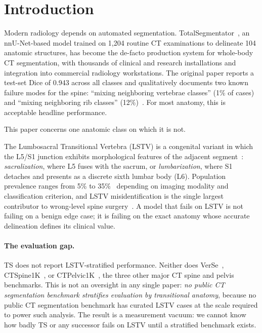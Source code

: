 \documentclass{article}
\newcommand{\TS}{TotalSegmentator}
\begin{document}
\section{Introduction}
\label{sec:intro}

Modern radiology depends on automated segmentation.
\TS{}~\citep{Wasserthal2023TotalSegmentator:Images}, an nnU-Net-based
model trained on 1{,}204 routine CT examinations to delineate
104 anatomic structures, has become the de-facto production
system for whole-body CT segmentation, with thousands of clinical
and research installations and integration into commercial
radiology workstations.
The original paper reports a test-set Dice of 0.943 across all
classes and qualitatively documents two known failure modes for
the spine: ``mixing neighboring vertebrae classes'' (1\% of cases)
and ``mixing neighboring rib classes''
(12\%)~\citep[Figure 4]{Wasserthal2023TotalSegmentator:Images}.
For most anatomy, this is acceptable headline performance.

This paper concerns one anatomic class on which it is not.

The Lumbosacral Transitional Vertebra (LSTV) is a congenital
variant in which the L5/S1 junction exhibits morphological features
of the adjacent segment~\citep{Castellvi1984LumbosacralDefects}: \emph{sacralization},
where L5 fuses with the sacrum, or \emph{lumbarization}, where S1
detaches and presents as a discrete sixth lumbar body (L6).
Population prevalence ranges from 5\% to
35\%~\citep{Sekharappa2014LumbosacralSignificance} depending on imaging modality
and classification criterion, and LSTV misidentification is the
single largest contributor to wrong-level spine
surgery~\citep{Konin2010LumbosacralRelevance,Carrino2011EffectImaging}.
A model that fails on LSTV is not failing on a benign edge case;
it is failing on the exact anatomy whose accurate delineation
defines its clinical value.

\paragraph{The evaluation gap.}
TS does not report LSTV-stratified performance.
Neither does VerSe~\citep{Sekuboyina2020VerSe:Benchmark},
CTSpine1K~\citep{Deng2021CTSpine1K:Tomography}, or
CTPelvic1K~\citep{Liu2021DeepModels}, the three other major CT spine
and pelvis benchmarks.
This is not an oversight in any single paper:
\emph{no public CT segmentation benchmark stratifies evaluation
by transitional anatomy}, because no public CT segmentation
benchmark has curated LSTV cases at the scale required to power
such analysis.
The result is a measurement vacuum: we cannot know how badly TS
or any successor fails on LSTV until a stratified benchmark
exists.
\end{document}

